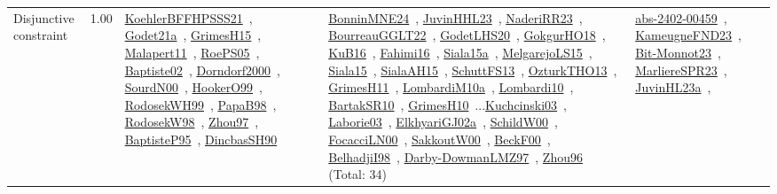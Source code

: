 {\begin{longtable}{p{3cm}r>{\raggedright\arraybackslash}p{6cm}>{\raggedright\arraybackslash}p{6cm}>{\raggedright\arraybackslash}p{8cm}}
\index{Disjunctive constraint}\index{Constraints!Disjunctive constraint}Disjunctive constraint &  1.00 & \href{../works/KoehlerBFFHPSSS21.pdf}{KoehlerBFFHPSSS21}~\cite{KoehlerBFFHPSSS21}, \href{../works/Godet21a.pdf}{Godet21a}~\cite{Godet21a}, \href{../works/GrimesH15.pdf}{GrimesH15}~\cite{GrimesH15}, \href{../works/Malapert11.pdf}{Malapert11}~\cite{Malapert11}, \href{../works/RoePS05.pdf}{RoePS05}~\cite{RoePS05}, \href{../works/Baptiste02.pdf}{Baptiste02}~\cite{Baptiste02}, \href{../works/Dorndorf2000.pdf}{Dorndorf2000}~\cite{Dorndorf2000}, \href{../works/SourdN00.pdf}{SourdN00}~\cite{SourdN00}, \href{../works/HookerO99.pdf}{HookerO99}~\cite{HookerO99}, \href{../works/RodosekWH99.pdf}{RodosekWH99}~\cite{RodosekWH99}, \href{../works/PapaB98.pdf}{PapaB98}~\cite{PapaB98}, \href{../works/RodosekW98.pdf}{RodosekW98}~\cite{RodosekW98}, \href{../works/Zhou97.pdf}{Zhou97}~\cite{Zhou97}, \href{../works/BaptisteP95.pdf}{BaptisteP95}~\cite{BaptisteP95}, \href{../works/DincbasSH90.pdf}{DincbasSH90}~\cite{DincbasSH90} & \href{../works/BonninMNE24.pdf}{BonninMNE24}~\cite{BonninMNE24}, \href{../works/JuvinHHL23.pdf}{JuvinHHL23}~\cite{JuvinHHL23}, \href{../works/NaderiRR23.pdf}{NaderiRR23}~\cite{NaderiRR23}, \href{../works/BourreauGGLT22.pdf}{BourreauGGLT22}~\cite{BourreauGGLT22}, \href{../works/GodetLHS20.pdf}{GodetLHS20}~\cite{GodetLHS20}, \href{../works/GokgurHO18.pdf}{GokgurHO18}~\cite{GokgurHO18}, \href{../works/KuB16.pdf}{KuB16}~\cite{KuB16}, \href{../works/Fahimi16.pdf}{Fahimi16}~\cite{Fahimi16}, \href{../works/Siala15a.pdf}{Siala15a}~\cite{Siala15a}, \href{../works/MelgarejoLS15.pdf}{MelgarejoLS15}~\cite{MelgarejoLS15}, \href{../works/Siala15.pdf}{Siala15}~\cite{Siala15}, \href{../works/SialaAH15.pdf}{SialaAH15}~\cite{SialaAH15}, \href{../works/SchuttFS13.pdf}{SchuttFS13}~\cite{SchuttFS13}, \href{../works/OzturkTHO13.pdf}{OzturkTHO13}~\cite{OzturkTHO13}, \href{../works/GrimesH11.pdf}{GrimesH11}~\cite{GrimesH11}, \href{../works/LombardiM10a.pdf}{LombardiM10a}~\cite{LombardiM10a}, \href{../works/Lombardi10.pdf}{Lombardi10}~\cite{Lombardi10}, \href{../works/BartakSR10.pdf}{BartakSR10}~\cite{BartakSR10}, \href{../works/GrimesH10.pdf}{GrimesH10}~\cite{GrimesH10}...\href{../works/Kuchcinski03.pdf}{Kuchcinski03}~\cite{Kuchcinski03}, \href{../works/Laborie03.pdf}{Laborie03}~\cite{Laborie03}, \href{../works/ElkhyariGJ02a.pdf}{ElkhyariGJ02a}~\cite{ElkhyariGJ02a}, \href{../works/SchildW00.pdf}{SchildW00}~\cite{SchildW00}, \href{../works/FocacciLN00.pdf}{FocacciLN00}~\cite{FocacciLN00}, \href{../works/SakkoutW00.pdf}{SakkoutW00}~\cite{SakkoutW00}, \href{../works/BeckF00.pdf}{BeckF00}~\cite{BeckF00}, \href{../works/BelhadjiI98.pdf}{BelhadjiI98}~\cite{BelhadjiI98}, \href{../works/Darby-DowmanLMZ97.pdf}{Darby-DowmanLMZ97}~\cite{Darby-DowmanLMZ97}, \href{../works/Zhou96.pdf}{Zhou96}~\cite{Zhou96} (Total: 34) & \href{../works/abs-2402-00459.pdf}{abs-2402-00459}~\cite{abs-2402-00459}, \href{../works/KameugneFND23.pdf}{KameugneFND23}~\cite{KameugneFND23}, \href{../works/Bit-Monnot23.pdf}{Bit-Monnot23}~\cite{Bit-Monnot23}, \href{../works/MarliereSPR23.pdf}{MarliereSPR23}~\cite{MarliereSPR23}, \href{../works/JuvinHL23a.pdf}{JuvinHL23a}~\cite{JuvinHL23a}, 
\end{longtable}}
